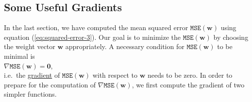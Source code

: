 \subsection{Some Useful Gradients}
In the last section, we have computed the mean squared error $\mathtt{MSE}(\mathbf{w})$ using equation
(\ref{eq:squared-error-3}).  Our goal is to minimize the $\mathtt{MSE}(\mathbf{w})$ by choosing the weight
vector $\mathbf{w}$ appropriately.  A necessary condition for $\mathtt{MSE}(\mathbf{w})$ to be minimal is 
\\[0.2cm]
\hspace*{1.3cm}
$\nabla \mathtt{MSE}(\mathbf{w}) = \mathbf{0}$,
\\[0.2cm]
i.e.~the \href{https://en.wikipedia.org/wiki/Gradient}{gradient}  of $\mathtt{MSE}(\mathbf{w})$ with respect to
$\mathbf{w}$ needs to be zero.  In order to prepare for the computation of 
$\nabla \mathtt{MSE}(\mathbf{w})$, we first compute the gradient of two simpler functions.

